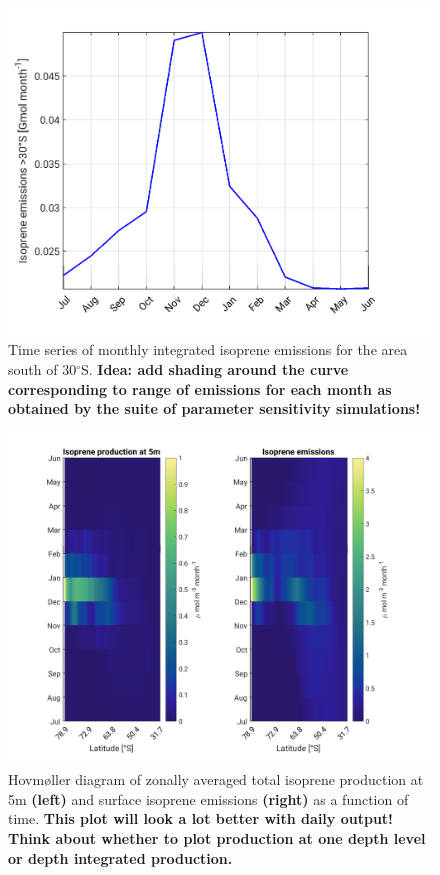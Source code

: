 \documentclass[draft,linenumbers]{agujournal}
\begin{document}
\begin{figure}[h]
\centering
\includegraphics[width=.6\textwidth]{Plots/Isoprene_emissions_monthly_timeSeries_031.png}
\caption{Time series of monthly integrated isoprene emissions for the area south of 30$^{\circ}$S. \textbf{Idea: add shading around the curve corresponding to range of emissions for each month as obtained by the suite of parameter sensitivity simulations!}}
\label{fig:emissions_ts}
\end{figure}

\begin{figure}[h]
\centering
\includegraphics[width=.9\textwidth]{Plots/Hovmoller_031_isoprene_prod_at_5m_srf_flux_circumpolar.png}
\caption{Hovm{\o}ller diagram of zonally averaged total isoprene production at 5m \textbf{(left)} and surface isoprene emissions \textbf{(right)} as a function of time. \textbf{This plot will look a lot better with daily output! Think about whether to plot production at one depth level or depth integrated production.}}
\label{fig:hovmoller}
\end{figure}
\end{document}
